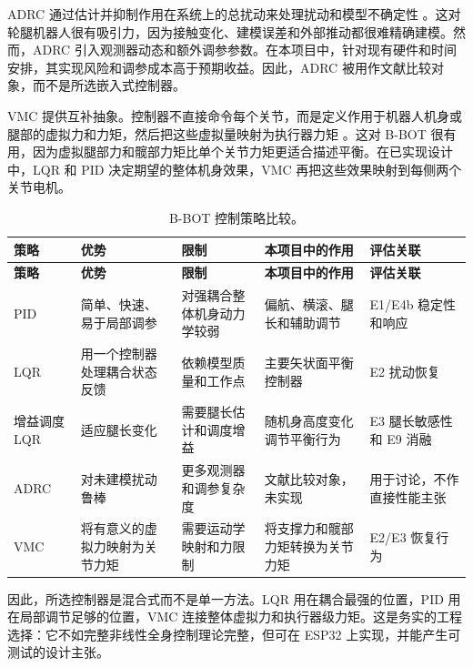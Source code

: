 \documentclass[12pt, a4paper]{article}
\begin{document}
ADRC 通过估计并抑制作用在系统上的总扰动来处理扰动和模型不确定性 \cite{han2009adrc}。这对轮腿机器人很有吸引力，因为接触变化、建模误差和外部推动都很难精确建模。然而，ADRC 引入观测器动态和额外调参参数。在本项目中，针对现有硬件和时间安排，其实现风险和调参成本高于预期收益。因此，ADRC 被用作文献比较对象，而不是所选嵌入式控制器。

VMC 提供互补抽象。控制器不直接命令每个关节，而是定义作用于机器人机身或腿部的虚拟力和力矩，然后把这些虚拟量映射为执行器力矩 \cite{pratt2001vmc}。这对 B-BOT 很有用，因为虚拟腿部力和髋部力矩比单个关节力矩更适合描述平衡。在已实现设计中，LQR 和 PID 决定期望的整体机身效果，VMC 再把这些效果映射到每侧两个关节电机。

\begingroup
\singlespacing
\scriptsize
\setlength{\tabcolsep}{2pt}
\renewcommand{\arraystretch}{1.15}
\begin{longtable}{>{\RaggedRight\arraybackslash}p{}>{\RaggedRight\arraybackslash}p{}>{\RaggedRight\arraybackslash}p{}>{\RaggedRight\arraybackslash}p{}>{\RaggedRight\arraybackslash}p{}}
\caption{B-BOT 控制策略比较。}\\
\toprule
\textbf{策略} & \textbf{优势} & \textbf{限制} & \textbf{本项目中的作用} & \textbf{评估关联} \\
\midrule
\endfirsthead
\toprule
\textbf{策略} & \textbf{优势} & \textbf{限制} & \textbf{本项目中的作用} & \textbf{评估关联} \\
\midrule
\endhead
PID & 简单、快速、易于局部调参 & 对强耦合整体机身动力学较弱 & 偏航、横滚、腿长和辅助调节 & E1/E4b 稳定性和响应 \\
LQR & 用一个控制器处理耦合状态反馈 & 依赖模型质量和工作点 & 主要矢状面平衡控制器 & E2 扰动恢复 \\
增益调度 LQR & 适应腿长变化 & 需要腿长估计和调度增益 & 随机身高度变化调节平衡行为 & E3 腿长敏感性和 E9 消融 \\
ADRC & 对未建模扰动鲁棒 & 更多观测器和调参复杂度 & 文献比较对象，未实现 & 用于讨论，不作直接性能主张 \\
VMC & 将有意义的虚拟力映射为关节力矩 & 需要运动学映射和力限制 & 将支撑力和髋部力矩转换为关节力矩 & E2/E3 恢复行为 \\
\bottomrule
\end{longtable}
\endgroup

因此，所选控制器是混合式而不是单一方法。LQR 用在耦合最强的位置，PID 用在局部调节足够的位置，VMC 连接整体虚拟力和执行器级力矩。这是务实的工程选择：它不如完整非线性全身控制理论完整，但可在 ESP32 上实现，并能产生可测试的设计主张。
\end{document}
